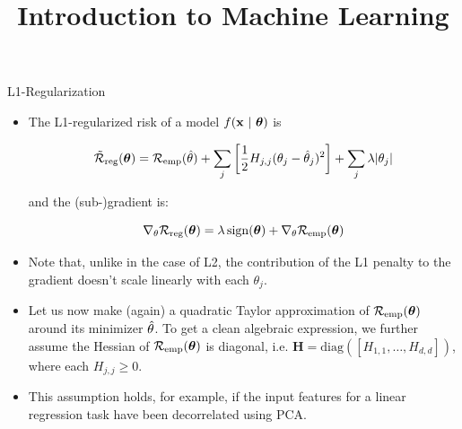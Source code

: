 \documentclass[11pt,compress,t,notes=noshow, xcolor=table]{beamer}
\title{Introduction to Machine Learning}
\date{}
\begin{document}

\begin{vbframe} {L1-Regularization}
  

  \begin{itemize}
    \item The L1-regularized risk of a model $f(\mathbf{x} ~|~ \bm{\theta})$ is

      \[
     \mathcal{\tilde R}_{\text{reg}}(\bm{\theta}) = \mathcal{R}_{\text{emp}}(\hat{\theta}) + \sum_j \left[ \frac{1}{2} H_{j,j} (\theta_j - \hat{\theta}_j)^2 \right] + \sum_j \lambda |\theta_j|
      \] 
      
      and the (sub-)gradient is:
      
      $$\nabla_{\theta} \mathcal{R}_{\text{reg}}(\bm{\theta}) = \lambda \operatorname{sign}(\bm{\theta}) + \nabla_{\theta} \mathcal{R}_{\text{emp}}(\bm{\theta})$$

    \item Note that, unlike in the case of L2, the contribution of the L1 penalty to the gradient doesn't scale linearly with each $\theta_j$. 
    \item Let us now make (again) a quadratic Taylor approximation of $\mathcal{R}_{\text{emp}}(\bm{\theta})$ around its minimizer $\hat{\theta}$. To get a clean algebraic expression, we further assume the Hessian of $\mathcal{R}_{\text{emp}}(\bm{\theta})$ is diagonal, i.e. $\bm{H} = \text{diag}([H_{1,1}, \ldots , H_{d,d}])$, where each $H_{j,j} \geq 0$.
    \item This assumption holds, for example, if the input features for a linear regression task have been decorrelated using PCA.
  \end{itemize}
  
  \framebreak
  

\end{vbframe}
\end{document}
